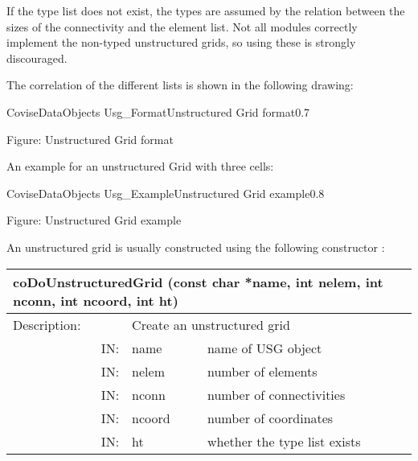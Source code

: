 If the type list does not exist, the types are assumed by the relation between the 
sizes of the connectivity and the element list. Not all modules correctly implement 
the non-typed unstructured grids, so using these is strongly discouraged.

The correlation of the different lists is shown in the following drawing:

\begin{covimg}{CoviseDataObjects}
		    {Usg_Format}{Unstructured Grid format}{0.7}\end{covimg}
\begin{htmlonly}
Figure: Unstructured Grid format
\end{htmlonly}

An example for an unstructured Grid with three cells:

\begin{covimg}{CoviseDataObjects}
		    {Usg_Example}{Unstructured Grid example}{0.8}\end{covimg}
\begin{htmlonly}
Figure: Unstructured Grid example
\end{htmlonly}
\vspace*{1cm}


An unstructured grid is usually constructed using the following 
constructor :


\begin{longtable}{|p{4cm}|p{2.5cm}|p{7cm}|}
\hline
\multicolumn{3}{|p{13.5cm}|}{\bf coDoUnstructuredGrid\newline
              (const char *name, int nelem, int nconn, int ncoord, int ht)}\\
\hline
{Description:}  
       & \multicolumn{2}{p{9.5cm}|}{Create an unstructured grid} \\
\hline
\multicolumn{1}{|r|}{IN:} & {name} 
                          & {name of USG object}\\
\hline
\multicolumn{1}{|r|}{IN:} & {nelem} 
                          & {number of elements}\\
\hline
\multicolumn{1}{|r|}{IN:} & {nconn} 
                          & {number of connectivities}\\
\hline
\multicolumn{1}{|r|}{IN:} & {ncoord} 
                          & {number of coordinates}\\
\hline
\multicolumn{1}{|r|}{IN:} & {ht} 
                          & {whether the type list exists}\endhead
\hline
\end{longtable}

